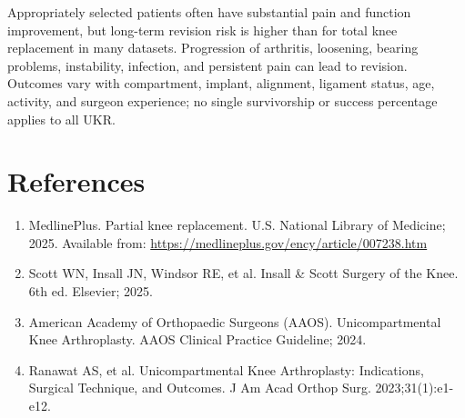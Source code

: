 Appropriately selected patients often have substantial pain and function improvement, but long-term revision risk is higher than for total knee replacement in many datasets. Progression of arthritis, loosening, bearing problems, instability, infection, and persistent pain can lead to revision. Outcomes vary with compartment, implant, alignment, ligament status, age, activity, and surgeon experience; no single survivorship or success percentage applies to all UKR.

\section*{References}
\begin{enumerate}
  \item MedlinePlus. Partial knee replacement. U.S. National Library of Medicine; 2025. Available from: \url{https://medlineplus.gov/ency/article/007238.htm}
  
  \item Scott WN, Insall JN, Windsor RE, et al. Insall \& Scott Surgery of the Knee. 6th ed. Elsevier; 2025.
  
  \item American Academy of Orthopaedic Surgeons (AAOS). Unicompartmental Knee Arthroplasty. AAOS Clinical Practice Guideline; 2024.
  
  \item Ranawat AS, et al. Unicompartmental Knee Arthroplasty: Indications, Surgical Technique, and Outcomes. J Am Acad Orthop Surg. 2023;31(1):e1-e12.
\end{enumerate}

\clearpage
